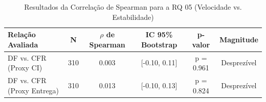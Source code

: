 
\begin{table}[htbp]
\centering
\caption{Resultados da Correlação de Spearman para a RQ 05 (Velocidade vs. Estabilidade)}
\label{tab:rq05_spearman}
\begin{tabular}{|l|c|c|c|c|c|}
\hline
\textbf{Relação Avaliada} & \textbf{N} & \textbf{$\rho$ de Spearman} & \textbf{IC 95\% Bootstrap} & \textbf{p-valor} & \textbf{Magnitude} \\
\hline
DF vs. CFR (Proxy CI) & 310 & 0.003 & [-0.10, 0.11] & p = 0.961 & Desprezível \\
DF vs. CFR (Proxy Entrega) & 310 & 0.013 & [-0.10, 0.13] & p = 0.824 & Desprezível \\
\hline
\end{tabular}
\end{table}

